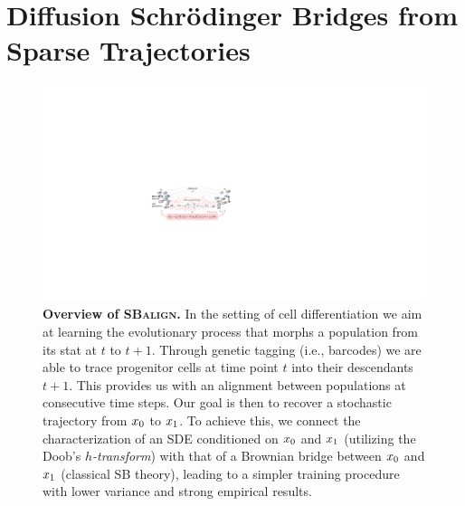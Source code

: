 \newpage
\section{Diffusion Schr{\"o}dinger Bridges from Sparse Trajectories}
\label{sec:sbalign}

\begin{figure}[H]
    \centering
    \includegraphics[width=.8\linewidth]{figures/fig_overview_sbalign.pdf}
    \caption{\textbf{Overview of \textsc{SBalign}.} In the setting of cell differentiation we aim at learning the evolutionary process that morphs a population from its stat at $t$ to $t+1$. Through genetic tagging (i.e., barcodes) we are able to trace progenitor cells at time point $t$ into their descendants $t+1$. This provides us with an alignment between populations at consecutive time steps. Our goal is then to recover a stochastic trajectory from $x_0$ to $x_1$. To achieve this, we connect the characterization of an \acrshort{SDE} conditioned on $x_0$ and $x_1$ (utilizing the Doob's \emph{$h$-transform}) with that of a Brownian bridge between $x_0$ and $x_1$ (classical \acrlong{SB} theory), leading to a simpler training procedure with lower variance and strong empirical results.}
    \label{fig:overview_sbalign}
\end{figure}

